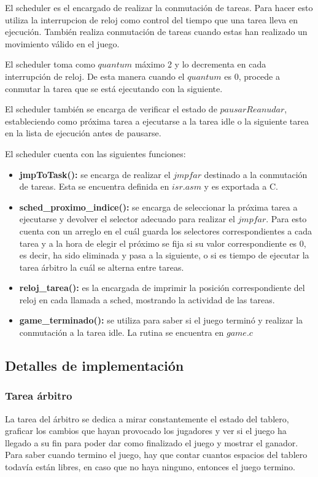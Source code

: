 \documentclass[a4paper,10pt,twoside]{article}
\begin{document}
El scheduler es el encargado de realizar la conmutación de tareas. Para hacer esto utiliza la interrupcion de reloj como control del tiempo que una tarea lleva en ejecución. También realiza conmutación de tareas cuando estas han realizado un movimiento válido en el juego.

El scheduler toma como $quantum$ máximo 2 y lo decrementa en cada interrupción de reloj. De esta manera cuando el $quantum$ es 0, procede a conmutar la tarea que se está ejecutando con la siguiente.

El scheduler también se encarga de verificar el estado de $pausarReanudar$, estableciendo como próxima tarea a ejecutarse a la tarea idle o la siguiente tarea en la lista de ejecución antes de pausarse.

El scheduler cuenta con las siguientes funciones:
\begin{itemize}
	\item \textbf{jmpToTask():} se encarga de realizar el $jmp far$ destinado a la conmutación de tareas. Esta se encuentra definida en $isr.asm$ y es exportada a C.
	\item \textbf{sched\_proximo\_indice():} se encarga de seleccionar la próxima tarea a ejecutarse y devolver el selector adecuado para realizar el $jmp far$. Para esto cuenta con un arreglo en el cuál guarda los selectores correspondientes a cada tarea y a la hora de elegir el próximo se fija si su valor correspondiente es $0$, es decir, ha sido eliminada y pasa a la siguiente, o si es tiempo de ejecutar la tarea árbitro la cuál se alterna entre tareas.
	\item \textbf{reloj\_tarea():} es la encargada de imprimir la posición correspondiente del reloj en cada llamada a sched, mostrando la actividad de las tareas.
	\item \textbf{game\_terminado():} se utiliza para saber si el juego terminó y realizar la conmutación a la tarea idle. La rutina se encuentra en $game.c$
\end{itemize}


\subsection{Detalles de implementación}


\subsubsection{Tarea árbitro}

La tarea del árbitro se dedica a mirar constantemente el estado del tablero, graficar los cambios que hayan provocado los jugadores y ver si el juego ha llegado a su fin para poder dar como finalizado el juego y mostrar el ganador.
Para saber cuando termino el juego, hay que contar cuantos espacios del tablero todavía están libres, en caso que no haya ninguno, entonces el juego termino.
\end{document}
